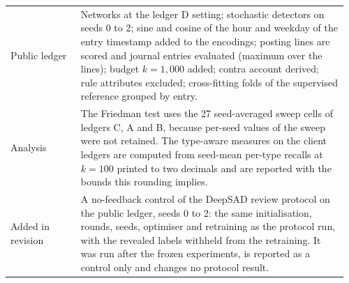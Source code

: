 \begin{table}[tbp]
\begin{tabular}{@{}>{\raggedright\arraybackslash}p{0.2\linewidth}>{\raggedright\arraybackslash}p{0.76\linewidth}@{}}
Public ledger & Networks at the ledger D setting; stochastic detectors on seeds 0 to 2; sine and cosine of the hour and weekday of the entry timestamp added to the encodings; posting lines are scored and journal entries evaluated (maximum over the lines); budget $k = 1{,}000$ added; contra account derived; rule attributes excluded; cross-fitting folds of the supervised reference grouped by entry. \\
Analysis & The Friedman test uses the 27 seed-averaged sweep cells of ledgers C, A and B, because per-seed values of the sweep were not retained. The type-aware measures on the client ledgers are computed from seed-mean per-type recalls at $k = 100$ printed to two decimals and are reported with the bounds this rounding implies. \\
Added in revision & A no-feedback control of the DeepSAD review protocol on the public ledger, seeds 0 to 2: the same initialisation, rounds, seeds, optimiser and retraining as the protocol run, with the revealed labels withheld from the retraining. It was run after the frozen experiments, is reported as a control only and changes no protocol result. \\
\bottomrule
\end{tabular}
\end{table}
